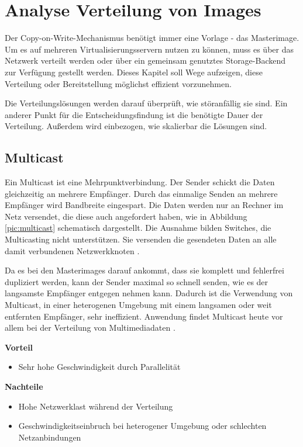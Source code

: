 
\chapter{Analyse Verteilung von Images}\label{verteilung}{ \fontsize{11.8pt}{13.2pt}\selectfont
Der Copy-on-Write-Mechanismus benötigt immer eine Vorlage - das Masterimage. Um es auf mehreren Virtualisierungsservern nutzen zu können, muss es über das Netzwerk verteilt werden oder über ein gemeinsam genutztes Storage-Backend zur Verfügung gestellt werden. Dieses Kapitel soll Wege aufzeigen, diese Verteilung oder Bereitstellung möglichst effizient vorzunehmen.

Die Verteilungslösungen werden darauf überprüft, wie störanfällig sie sind. Ein anderer Punkt für die Entscheidungsfindung ist die benötigte Dauer der Verteilung. Außerdem wird einbezogen, wie skalierbar die Lösungen sind.

\section{Multicast}
Ein Multicast ist eine Mehrpunktverbindung. Der Sender schickt die Daten gleichzeitig an mehrere Empfänger. Durch das einmalige Senden an mehrere Empfänger wird Bandbreite eingespart. Die Daten werden nur an Rechner im Netz versendet, die diese auch angefordert haben, wie in Abbildung \ref{pic:multicast} schematisch dargestellt. Die Ausnahme bilden Switches, die Multicasting nicht unterstützen. Sie versenden die gesendeten Daten an alle damit verbundenen Netzwerkknoten \cite{Multicasttech}.}

Da es bei den Masterimages darauf ankommt, dass sie komplett und fehlerfrei dupliziert werden, kann der Sender maximal so schnell senden, wie es der langsamste Empfänger entgegen nehmen kann.  Dadurch ist die Verwendung von Multicast, in einer heterogenen Umgebung mit einem langsamen oder weit entfernten Empfänger, sehr ineffizient. Anwendung findet Multicast heute vor allem bei der Verteilung von Multimediadaten \cite{multicastfefe}. 


\textbf{Vorteil}
\begin{itemize}
 \item Sehr hohe Geschwindigkeit durch Parallelität
\end{itemize}

\textbf{Nachteile}
\begin{itemize}
 \item Hohe Netzwerklast während der Verteilung
 \item Geschwindigkeitseinbruch bei heterogener Umgebung oder schlechten Netzanbindungen
\end{itemize}

